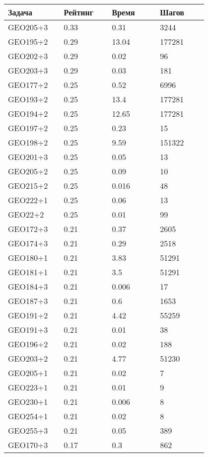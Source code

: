 \begin{longtable}[H]{|p{0.2\linewidth}|p{0.2\linewidth}|p{0.2\linewidth}|p{0.2\linewidth}|}
\hline
\textbf{Задача} & \textbf{Рейтинг} & \textbf{Время} & \textbf{Шагов} \\
\hline
GEO205+3 & 0.33 & 0.31 & 3244 \\
\hline
GEO195+2 & 0.29 & 13.04 & 177281 \\
\hline
GEO202+3 & 0.29 & 0.02 & 96 \\
\hline
GEO203+3 & 0.29 & 0.03 & 181 \\
\hline
GEO177+2 & 0.25 & 0.52 & 6996 \\
\hline
GEO193+2 & 0.25 & 13.4 & 177281 \\
\hline
GEO194+2 & 0.25 & 12.65 & 177281 \\
\hline
GEO197+2 & 0.25 & 0.23 & 15 \\
\hline
GEO198+2 & 0.25 & 9.59 & 151322 \\
\hline
GEO201+3 & 0.25 & 0.05 & 13 \\
\hline
GEO205+2 & 0.25 & 0.09 & 10 \\
\hline
GEO215+2 & 0.25 & 0.016 & 48 \\
\hline
GEO222+1 & 0.25 & 0.06 & 13 \\
\hline
GEO22+2 & 0.25 & 0.01 & 99 \\
\hline
GEO172+3 & 0.21 & 0.37 & 2605 \\
\hline
GEO174+3 & 0.21 & 0.29 & 2518 \\
\hline
GEO180+1 & 0.21 & 3.83 & 51291 \\
\hline
GEO181+1 & 0.21 & 3.5 & 51291 \\
\hline
GEO184+3 & 0.21 & 0.006 & 17 \\
\hline
GEO187+3 & 0.21 & 0.6 & 1653 \\
\hline
GEO191+2 & 0.21 & 4.42 & 55259 \\
\hline
GEO191+3 & 0.21 & 0.01 & 38 \\
\hline
GEO196+2 & 0.21 & 0.02 & 188 \\
\hline
GEO203+2 & 0.21 & 4.77 & 51230 \\
\hline
GEO205+1 & 0.21 & 0.02 & 7 \\
\hline
GEO223+1 & 0.21 & 0.01 & 9 \\
\hline
GEO230+1 & 0.21 & 0.006 & 8 \\
\hline
GEO254+1 & 0.21 & 0.02 & 8 \\
\hline
GEO255+3 & 0.21 & 0.05 & 389 \\
\hline
GEO170+3 & 0.17 & 0.3 & 862 \\

\end{longtable}
